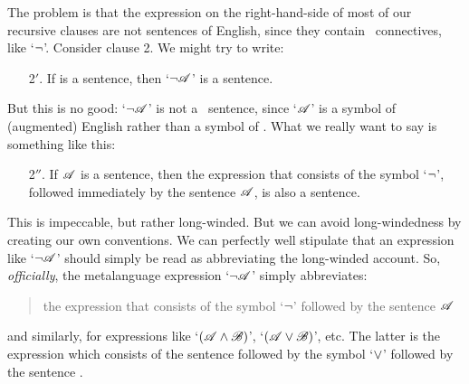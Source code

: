 The problem is that the expression on the right-hand-side of most of our recursive clauses are not sentences of English, since they contain \TFL\ connectives, like `$\neg$'. Consider clause 2. We might try to write:
	\begin{enumerate}
		\item[2$'$.] If  is a sentence, then `$\neg \mathscr{A}$' is a sentence.
	\end{enumerate}
But this is no good: `$\neg \mathscr{A}$' is not a \TFL\ sentence, since `$\mathscr{A}$' is a symbol of (augmented) English rather than a symbol of \TFL. What we really want to say is something like this:
	\begin{enumerate}
		\item[2$''$.] If $\mathscr{A}$ is a sentence, then the expression that consists of the symbol `$\neg$', followed immediately by the sentence $\mathscr{A}$, is also a sentence.
	\end{enumerate}
This is impeccable, but rather long-winded. %
But we can avoid long-windedness by creating our own conventions. We can perfectly well stipulate that an expression like `$\neg \mathscr{A}$' should simply be read as abbreviating the long-winded account. So, \emph{officially}, the metalanguage expression `$\neg \mathscr{A}$'
simply abbreviates:
\begin{quote}
	the expression that consists of the symbol `$\neg$' followed by the sentence $\mathscr{A}$
\end{quote}
and similarly, for expressions like `$(\mathscr{A} \wedge \mathscr{B})$', `$(\mathscr{A} \vee \mathscr{B})$', etc. The latter is the expression which consists of the sentence  followed by the symbol `$\vee$' followed by the sentence .


